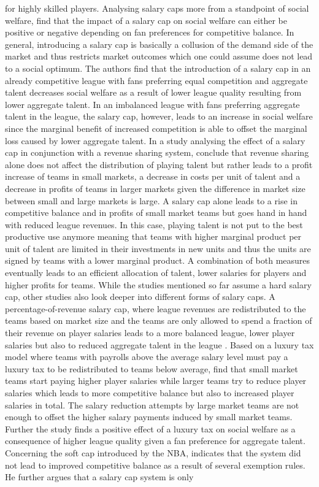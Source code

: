 \documentclass[12pt, a4paper]{article}
\begin{document}
for highly skilled players. Analysing salary caps more from a standpoint of social welfare, \citet{dietl_effect_2009} find that the impact of a salary cap on social welfare can either be positive or negative depending on fan preferences for competitive balance. In general, introducing a salary cap is basically a collusion of the demand side of the market and thus restricts market outcomes which one could assume does not lead to a social optimum. The authors find that the introduction of a salary cap in an already competitive league with fans preferring equal competition and aggregate talent decreases social welfare as a result of lower league quality resulting from lower aggregate talent. In an imbalanced league with fans preferring aggregate talent in the league, the salary cap, however, leads to an increase in social welfare since the marginal benefit of increased competition is able to offset the marginal loss caused by lower aggregate talent. In a study analysing the effect of a salary cap in conjunction with a revenue sharing system, \citet{dietl_combined_2011} conclude that revenue sharing alone does not affect the distribution of playing talent but rather leads to a profit increase of teams in small markets, a decrease in costs per unit of talent and a decrease in profits of teams in larger markets given the difference in market size between small and large markets is large. A salary cap alone leads to a rise in competitive balance and in profits of small market teams but goes hand in hand with reduced league revenues. In this case, playing talent is not put to the best productive use anymore meaning that teams with higher marginal product per unit of talent are limited in their investments in new units and thus the units are signed by teams with a lower marginal product. A combination of both measures eventually leads to an efficient allocation of talent, lower salaries for players and higher profits for teams. While the studies mentioned so far assume a hard salary cap, other studies also look deeper into different forms of salary caps. A percentage-of-revenue salary cap, where league revenues are redistributed to the teams based on market size and the teams are only allowed to spend a fraction of their revenue on player salaries leads to a more balanced league, lower player salaries but also to reduced aggregate talent in the league \citep{dietl_salary_2012}. Based on a luxury tax model where teams with payrolls above the average salary level must pay a luxury tax to be redistributed to teams below average, \citet{dietl_effect_2010} find that small market teams start paying higher player salaries while larger teams try to reduce player salaries which leads to more competitive balance but also to increased player salaries in total. The salary reduction attempts by large market teams are not enough to offset the higher salary payments induced by small market teams. Further the study finds a positive effect of a luxury tax on social welfare as a consequence of higher league quality given a fan preference for aggregate talent. Concerning the soft cap introduced by the NBA, \citet{szymanski_economic_2003} indicates that the system did not lead to improved competitive balance as a result of several exemption rules. He further argues that a salary cap system is only 
\end{document}
